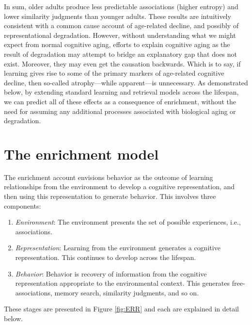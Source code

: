 \documentclass[
  man]{apa6}
\providecommand{\tightlist}{%
  \setlength{\itemsep}{0pt}\setlength{\parskip}{0pt}}
\begin{document}
In sum, older adults produce less predictable associations (higher entropy) and lower similarity judgments than younger adults. These results are intuitively consistent with a common cause account of age-related decline, and possibly of representational degradation. However, without understanding what we might expect from normal cognitive aging, efforts to explain cognitive aging as the result of degradation may attempt to bridge an explanatory gap that does not exist. Moreover, they may even get the causation backwards. Which is to say, if learning gives rise to some of the primary markers of age-related cognitive decline, then so-called atrophy---while apparent---is unnecessary. As demonstrated below, by extending standard learning and retrieval models across the lifespan, we can predict all of these effects as a consequence of enrichment, without the need for assuming any additional processes associated with biological aging or degradation.

\hypertarget{the-enrichment-model}{%
\section{The enrichment model}\label{the-enrichment-model}}

The enrichment account envisions behavior as the outcome of learning relationships from the environment to develop a cognitive representation, and then using this representation to generate behavior. This involves three components:

\begin{enumerate}
\def\labelenumi{\arabic{enumi}.}
\tightlist
\item
  \emph{Environment}: The environment presents the set of possible experiences, i.e., associations.
\item
  \emph{Representation}: Learning from the environment generates a cognitive representation. This continues to develop across the lifespan.
\item
  \emph{Behavior}: Behavior is recovery of information from the cognitive representation appropriate to the environmental context. This generates free-associations, memory search, similarity judgments, and so on.
\end{enumerate}

These stages are presented in Figure \ref{fig:ERR} and each are explained in detail below.
\end{document}
